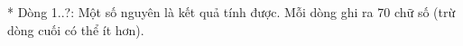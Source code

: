 * Dòng 1..?: Một số nguyên là kết quả tính được.  Mỗi dòng ghi ra 70 chữ số (trừ dòng cuối có thể ít hơn).  

\